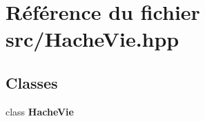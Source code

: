 \section{Référence du fichier src/\-Hache\-Vie.hpp}
\label{_hache_vie_8hpp}
\subsection*{Classes}
\begin{DoxyCompactItemize}
\item 
class {\bf Hache\-Vie}
\end{DoxyCompactItemize}
